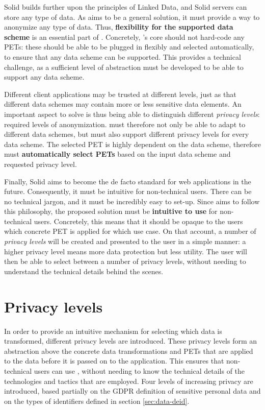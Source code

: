 Solid builds further upon the principles of Linked Data, and Solid servers can store any type of data. As \middleware{} aims to be a general solution, it must provide a way to anonymize any type of data. Thus, \textbf{flexibility for the supported data scheme} is an essential part of \middleware{}. Concretely, \middleware{}'s core should not hard-code any \gls{PETs}: these should be able to be plugged in flexibly and selected automatically, to ensure that any data scheme can be supported. This provides a technical challenge, as a sufficient level of abstraction must be developed to be able to support any data scheme.

Different client applications may be trusted at different levels, just as that different data schemes may contain more or less sensitive data elements. An important aspect to solve is thus being able to distinguish different \textit{privacy levels}: required levels of anonymization. \middleware{} must therefore not only be able to adapt to different data schemes, but must also support different privacy levels for every data scheme. The selected PET is highly dependent on the data scheme, therefore \middleware{} must \textbf{automatically select \gls{PETs}} based on the input data scheme and requested privacy level.

Finally, Solid aims to become the de facto standard for web applications in the future. Consequently, it must be intuitive for non-technical users. There can be no technical jargon, and it must be incredibly easy to set-up. Since \middleware{} aims to follow this philosophy, the proposed solution must be \textbf{intuitive to use} for non-technical users. Concretely, this means that it should be opaque to the users which concrete PET is applied for which use case. On that account, a number of \textit{privacy levels} will be created and presented to the user in a simple manner: a higher privacy level means more data protection but less utility. The user will then be able to select between a number of privacy levels, without needing to understand the technical details behind the scenes.

\section{Privacy levels}
In order to provide an intuitive mechanism for selecting which data is transformed, different privacy levels are introduced. These privacy levels form an abstraction above the concrete data transformations and \gls{PETs} that are applied to the data before it is passed on to the application. This ensures that non-technical users can use \middleware{}, without needing to know the technical details of the technologies and tactics that are employed. Four levels of increasing privacy are introduced, based partially on the \gls{GDPR} definition of sensitive personal data and on the types of identifiers defined in section \ref{sec:data-deid}.\\

